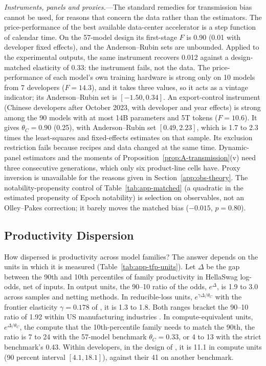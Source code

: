 

\emph{Instruments, panels and proxies.}---The standard remedies for transmission bias cannot be used, for reasons that
concern the data rather than the estimators. The price-performance of the best available data-center accelerator is a
step function of calendar time. On the 57-model design its first-stage $F$ is 0.90 (0.01 with developer fixed effects),
and the Anderson--Rubin sets are unbounded. Applied to the experimental outputs, the same instrument recovers 0.012
against a design-matched elasticity of 0.33: the instrument fails, not the data. The price-performance of each model's
own training hardware is strong only on 10 models from 7 developers ($F=14.3$), and it takes three values, so it acts
as a vintage indicator; its Anderson--Rubin set is $[-1.50,0.34]$. An export-control instrument (Chinese developers
after October 2023, with developer and year effects) is strong among the 90 models with at most 14B parameters and
5T tokens ($F=10.6$). It gives $\theta_C=0.90$ (0.25), with Anderson--Rubin set $[0.49,2.23]$, which is 1.7 to 2.3 times the
least-squares and fixed-effects estimates on that sample. Its exclusion restriction fails because recipes and data
changed at the same time. Dynamic-panel estimators \citep{arellano1991some,blundell1998initial} and the moments of
Proposition~\ref{prop:A-transmission}(v) need three consecutive generations, which only six product-line cells have.
Proxy inversion is unavailable for the reasons given in Section~\ref{app:obs-theory}. The notability-propensity control
of Table~\ref{tab:app-matched} (a quadratic in the estimated propensity of Epoch notability) is selection on
observables, not an Olley--Pakes correction; it barely moves the matched bias ($-0.015$, $p=0.80$).

\subsection{Productivity Dispersion}\label{app:obs-tfp}

How dispersed is productivity across model families? The answer depends on the units in which it is measured
(Table~\ref{tab:app-tfp-units}). Let $\Delta$ be the gap between the 90th and 10th percentiles of family productivity
in HellaSwag log-odds, net of inputs. In output units, the 90--10 ratio of the odds, $e^{\Delta}$, is 1.9 to 3.0 across
samples and netting methods. In reducible-loss units, $e^{\gamma\Delta/\theta_C}$ with the frontier elasticity
$\gamma=0.178$ of \citet{besiroglu2024chinchilla}, it is 1.3 to 1.8. Both ranges bracket the 90--10 ratio of 1.92
within US manufacturing industries \citep[see also \citealp{syverson2011determines}]{syverson2004product}. In
compute-equivalent units, $e^{\Delta/\theta_C}$, the compute that the 10th-percentile family needs to match the 90th,
the ratio is 7 to 24 with the 57-model benchmark $\theta_C=0.33$, or 4 to 13 with the strict benchmark's 0.43. Within
developers, in the design of \citet{mertens2026secret}, it is 11.1 in compute units (90 percent interval
$[4.1,18.1]$), against their 41 on another benchmark.

